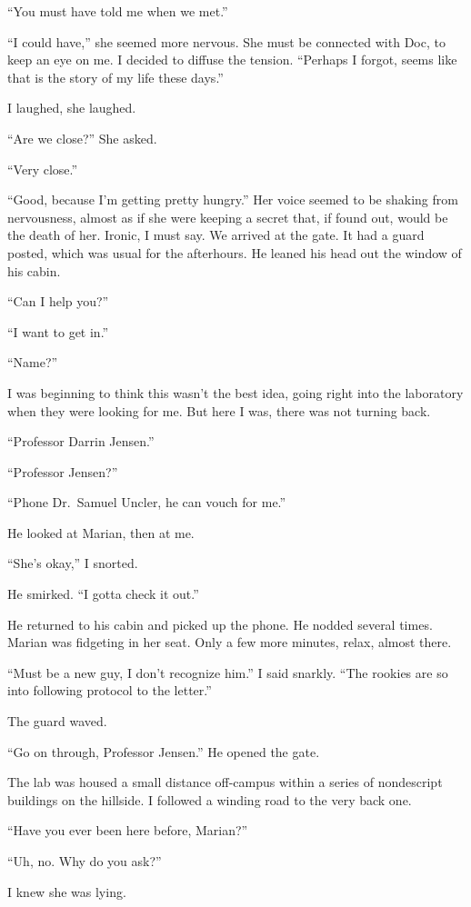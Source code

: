 \documentclass[
]{article}
\begin{document}
``You must have told me when we met.''

``I could have,'' she seemed more nervous. She must be connected with
Doc, to keep an eye on me. I decided to diffuse the tension. ``Perhaps I
forgot, seems like that is the story of my life these days.''

I laughed, she laughed.

``Are we close?'' She asked.

``Very close.''

``Good, because I'm getting pretty hungry.'' Her voice seemed to be
shaking from nervousness, almost as if she were keeping a secret that,
if found out, would be the death of her. Ironic, I must say. We arrived
at the gate. It had a guard posted, which was usual for the afterhours.
He leaned his head out the window of his cabin.

``Can I help you?''

``I want to get in.''

``Name?''

I was beginning to think this wasn't the best idea, going right into the
laboratory when they were looking for me. But here I was, there was not
turning back.

``Professor Darrin Jensen.''

``Professor Jensen?''

``Phone Dr.~Samuel Uncler, he can vouch for me.''

He looked at Marian, then at me.

``She's okay,'' I snorted.

He smirked. ``I gotta check it out.''

He returned to his cabin and picked up the phone. He nodded several
times. Marian was fidgeting in her seat. Only a few more minutes, relax,
almost there.

``Must be a new guy, I don't recognize him.'' I said snarkly. ``The
rookies are so into following protocol to the letter.''

The guard waved.

``Go on through, Professor Jensen.'' He opened the gate.

The lab was housed a small distance off-campus within a series of
nondescript buildings on the hillside. I followed a winding road to the
very back one.

``Have you ever been here before, Marian?''

``Uh, no. Why do you ask?''

I knew she was lying.
\end{document}
